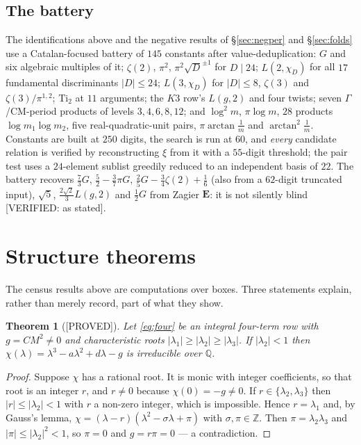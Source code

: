 \documentclass[11pt,reqno]{amsart}
\theoremstyle{plain}
\newtheorem{theorem}{Theorem}[section]
\theoremstyle{definition}
\theoremstyle{remark}
\theoremstyle{plain}
\newcommand{\Z}{\mathbb{Z}}
\newcommand{\Q}{\mathbb{Q}}
\newcommand{\Proved}{\textup{\textsf{[PROVED]}}}
\newcommand{\Verified}[1]{\textup{\textsf{[VERIFIED: #1]}}}
\begin{document}
\subsection{The battery}\label{sec:battery}
The identifications above and the negative results of \S\ref{sec:negper} and
\S\ref{sec:folds} use a Catalan-focused battery of $145$ constants after
value-deduplication: $G$ and six algebraic multiples of it; $\zeta(2)$, $\pi^2$,
$\pi^2\sqrt D^{\pm1}$ for $D\mid24$; $L(2,\chi_D)$ for all $17$ fundamental
discriminants $|D|\le24$; $L(3,\chi_D)$ for $|D|\le8$, $\zeta(3)$ and
$\zeta(3)/\pi^{1,2}$; $\mathrm{Ti}_2$ at $11$ arguments; the $K3$ row's $L(g,2)$
and four twists; seven $\Gamma$/CM-period products of levels $3,4,6,8,12$; and
$\log^2m$, $\pi\log m$, $28$ products $\log m_1\log m_2$, five
real-quadratic-unit pairs, $\pi\arctan\frac1m$ and $\arctan^2\frac1m$. Constants
are built at $250$ digits, the search is run at $60$, and \emph{every} candidate
relation is verified by reconstructing $\xi$ from it with a $55$-digit threshold;
the pair test uses a $24$-element sublist greedily reduced to an independent
basis of $22$. The battery recovers $\tfrac73G$, $\tfrac52-\tfrac37\pi G$,
$\tfrac25G-\tfrac34\zeta(2)+\tfrac16$ (also from a $62$-digit truncated input),
$\sqrt5$, $\tfrac{2\sqrt2}3L(g,2)$ and $\tfrac12G$ from Zagier $\mathbf E$: it is
not silently blind \Verified{as stated}.

\section{Structure theorems}\label{sec:structure}

The census results above are computations over boxes. Three statements explain,
rather than merely record, part of what they show.

\begin{theorem}[\Proved]\label{thm:D1}
Let \eqref{eq:four} be an integral four-term row with $g=CM^2\ne0$ and
characteristic roots $|\lambda_1|\ge|\lambda_2|\ge|\lambda_3|$. If
$|\lambda_2|<1$ then $\chi(\lambda)=\lambda^3-a\lambda^2+d\lambda-g$ is
irreducible over $\Q$.
\end{theorem}

\begin{proof}
Suppose $\chi$ has a rational root. It is monic with integer coefficients, so
that root is an integer $r$, and $r\ne0$ because $\chi(0)=-g\ne0$. If
$r\in\{\lambda_2,\lambda_3\}$ then $|r|\le|\lambda_2|<1$ with $r$ a non-zero
integer, which is impossible. Hence $r=\lambda_1$ and, by Gauss's lemma,
$\chi=(\lambda-r)(\lambda^2-\sigma\lambda+\pi)$ with $\sigma,\pi\in\Z$. Then
$\pi=\lambda_2\lambda_3$ and $|\pi|\le|\lambda_2|^2<1$, so $\pi=0$ and $g=r\pi=0$
--- a contradiction.
\end{proof}
\end{document}
